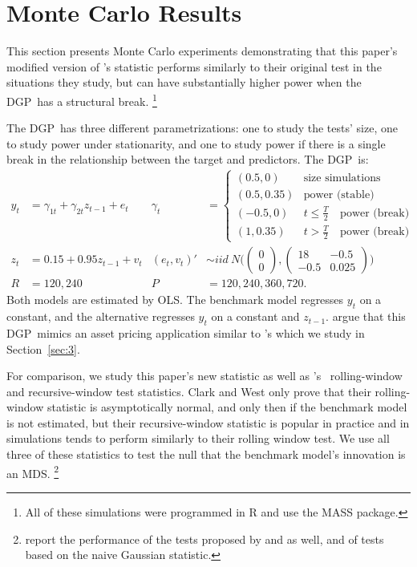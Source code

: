 \documentclass[12pt,fleqn]{article}
\newcommand\citepos[2][]{\citeauthor{#2}'s \citeyearpar[#1]{#2}}
\newcommand\poscw{\citeauthor{ClW:06}'s \citeyearpar{ClW:06,ClW:07}}
\theoremstyle{definition}
\newcommand{\dgp}{DGP}
\newcommand{\mds}{MDS}
\newcommand{\ols}{OLS}
\begin{document}
\section{Monte Carlo Results}\label{sec:2}
This section presents Monte Carlo experiments demonstrating that
this paper's modified version of \citepos{ClW:07} statistic performs
similarly to their original test in the situations they study, but can
have substantially higher power when the \dgp\ has a structural
break.%
\footnote{All of these simulations were programmed in R
  \citep[version 2.14.0]{R} and use the MASS
  \citep[7.3-22]{VeR:02} package.} %

The \dgp\ has three different parametrizations: one to study the
tests' size, one to study power under stationarity, and one to study
power if there is a single break in the relationship between the
target and predictors.  The \dgp\ is:
\begin{align*}
  y_t &= \gamma_{1t} + \gamma_{2t} z_{t-1} + e_t &
  \gamma_t &=
  \begin{cases}
    (0.5, 0)    & \text{size simulations} \\
    (0.5, 0.35) & \text{power (stable)} \\
    (-0.5, 0)    & t \leq \tfrac{T}{2} \quad \text{power (break)} \\
    (1, 0.35) & t > \tfrac{T}{2} \quad \text{power (break)}
  \end{cases}\\\nonumber
  z_t &= 0.15 + 0.95 z_{t-1} + v_t &
  (e_t, v_t)' &\sim iid\ N\Bigg(\begin{pmatrix} 0 \\ 0
  \end{pmatrix}
   , \begin{pmatrix} 18 & -
    0.5 \\ -0.5 & 0.025 \end{pmatrix}\Bigg)
  \\ R &= 120, 240 & P &= 120, 240, 360, 720.
\end{align*}
Both models are estimated by \ols. The benchmark model regresses $y_t$
on a constant, and the alternative regresses $y_t$ on a constant and
$z_{t-1}$.  \citet{ClW:07} argue that this \dgp\ mimics an asset
pricing application similar to \citepos{GoW:08} which we study in
Section~\ref{sec:3}.

For comparison, we study this paper's new statistic as well as \poscw\
rolling-window and recursive-window test statistics.  Clark and West
only prove that their rolling-window statistic is asymptotically
normal, and only then if the benchmark model is not estimated, but
their recursive-window statistic is popular in practice and in
simulations tends to perform similarly to their rolling window test.
We use all three of these statistics to test the null that the
benchmark model's innovation is an \mds.%
\footnote{\citet{ClW:07}
  report the performance of the tests proposed by \citet{CCS:01} and
  \citet{ClM:05} as well, and of tests based on the naive Gaussian
  statistic.} %
\end{document}
